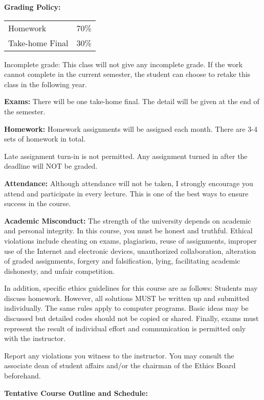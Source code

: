 \documentclass[a4paper,10pt]{article}
\begin{document}
\textbf{Grading Policy:}

\begin{tabular}{lr}
Homework & 70\%\\ 
Take-home Final & 30\% \\
\end{tabular}

Incomplete grade: This class will not give any
incomplete grade. If the work cannot complete in the
current semester, the student can choose to retake this
class in the following year.




\textbf{Exams:} There will be one take-home final. The detail will be given at the end of the semester. 


\textbf{Homework:} Homework assignments will be assigned each month. There are 3-4 sets of homework in total. 

Late assignment turn-in is not permitted. Any assignment turned in after the deadline will NOT be graded.




\textbf{Attendance:} Although attendance will not be taken, I strongly encourage you attend and participate in every lecture. This is one of the best ways to ensure success in the course.






\textbf{Academic Misconduct:} The strength of the university depends on academic and personal integrity. In this course, you must be honest 
and truthful. Ethical violations include cheating on exams, plagiarism, reuse of assignments, improper use 
of the Internet and electronic devices, unauthorized collaboration, alteration of graded assignments, forgery 
and falsification, lying, facilitating academic dishonesty, and unfair competition.

In addition, specific ethics guidelines for this course are as follows: Students may discuss homework. However, 
all solutions MUST be written up and submitted individually. The same rules apply to computer programs. 
Basic ideas may be discussed but detailed codes should not be copied or shared. Finally, exams must 
represent the result of individual effort and communication is permitted only with the instructor.

Report any violations you witness to the instructor. You may consult the associate dean of student affairs 
and/or the chairman of the Ethics Board beforehand. 

\textbf{Tentative Course Outline and Schedule:}
\end{document}
